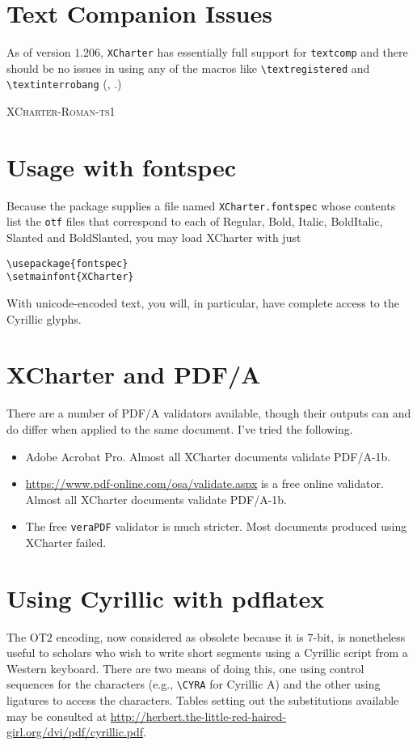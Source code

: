 \documentclass[11pt]{article}
\begin{document}
\section{Text Companion Issues}
As of version $1.206$, {\tt XCharter} has essentially full support for {\tt textcomp} and there should be no issues in using any of the macros like \verb|\textregistered| and \verb|\textinterrobang| (\textregistered, \textinterrobang.)

\textsc{XCharter-Roman-ts1}
\newpage
\section{Usage with fontspec}
Because the package supplies a file named {\tt XCharter.fontspec} whose contents list the {\tt otf} files that correspond to each of Regular, Bold, Italic, BoldItalic, Slanted and BoldSlanted, you may load XCharter with just
\begin{verbatim}
\usepackage{fontspec}
\setmainfont{XCharter}
\end{verbatim}
With unicode-encoded text, you will, in particular,  have complete access to the Cyrillic glyphs.

\section{XCharter and PDF/A}
There are a number of PDF/A validators available, though their outputs can and do differ when applied to the same document. I've tried the following.
\begin{itemize}
\item
Adobe Acrobat Pro. Almost all XCharter documents validate PDF/A-1b.
\item 
\url{https://www.pdf-online.com/osa/validate.aspx} is a free online validator. Almost all XCharter documents validate PDF/A-1b.
\item 
The free {\tt veraPDF} validator is much stricter. Most documents produced using XCharter failed. 
\end{itemize}
\newpage

\section{Using Cyrillic with pdflatex}
The OT$2$ encoding, now considered as obsolete because it is 7-bit, is nonetheless useful to scholars who wish to write short segments using a Cyrillic script from a Western keyboard. There are two means of doing this, one using control sequences for the characters (e.g., \verb|\CYRA| for Cyrillic A) and the other using ligatures to access the characters. Tables setting out the substitutions available may be consulted at \url{http://herbert.the-little-red-haired-girl.org/dvi/pdf/cyrillic.pdf}.
\end{document}
